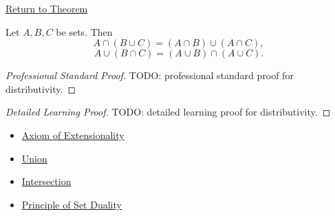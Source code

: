 \newpage
{}
\label{prf:distributivity}

\begin{remark*}[Return]
\hyperref[thm:distributivity]{Return to Theorem}
\end{remark*}

\begin{theorem*}
Let $A,B,C$ be sets. Then
\[
A \cap (B \cup C) = (A \cap B) \cup (A \cap C),
\]
\[
A \cup (B \cap C) = (A \cup B) \cap (A \cup C).
\]
\end{theorem*}

\begin{proof}[Professional Standard Proof]
\LRAProofBodyStart
TODO: professional standard proof for distributivity.
\end{proof}

\begin{proof}[Detailed Learning Proof]
\LRAProofBodyStart
TODO: detailed learning proof for distributivity.
\end{proof}

\begin{remark*}
\end{remark*}

\begin{dependencies}
\begin{itemize}
  \item \hyperref[ax:extensionality]{Axiom of Extensionality}
  \item \hyperref[def:union]{Union}
  \item \hyperref[def:intersection]{Intersection}
  \item \hyperref[cor:set-duality]{Principle of Set Duality}
\end{itemize}
\end{dependencies}

\clearpage
